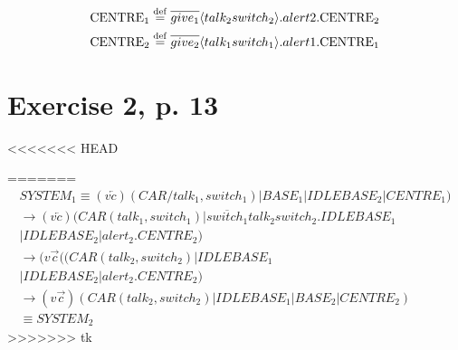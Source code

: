 \documentclass[11pt]{article}
\begin{document}
\begin{equation}
\begin{split}
{\rm CENTRE_1} \stackrel{\mathrm{def}}{=} \overline{give_1} \langle talk_2 switch_2 \rangle .alert2.{\rm CENTRE_2} \\ 
{\rm CENTRE_2} \stackrel{\mathrm{def}}{=} \overline{give_2} \langle talk_1 switch_1 \rangle .alert1.{\rm CENTRE_1}
\end{split}
\end{equation}


\section{Exercise 2, p. 13}

<<<<<<< HEAD

=======
\begin{equation}
\begin{split}
SYSTEM_1 \equiv  (v\overleftarrow{c})(CAR/talk_1,switch_1) | BASE_1 | IDLEBASE_2 | CENTRE_1) \\
\rightarrow (v\overleftarrow{c})(CAR(talk_1, switch_1) | \overline{switch_1}talk_2switch_2.IDLEBASE_1 \\
| IDLEBASE_2 | alert_2.CENTRE_2) \\
\rightarrow (v\overrightarrow{c}((CAR(talk_2,switch_2) | IDLEBASE_1 \\
| IDLEBASE_2 | alert_2.CENTRE_2) \\
\rightarrow (v\overrightarrow{c})(CAR(talk_2,switch_2) | IDLEBASE_1 | BASE_2 | CENTRE_2) \\
\equiv SYSTEM_2
\end{split}
\end{equation}
>>>>>>> tk
\end{document}
